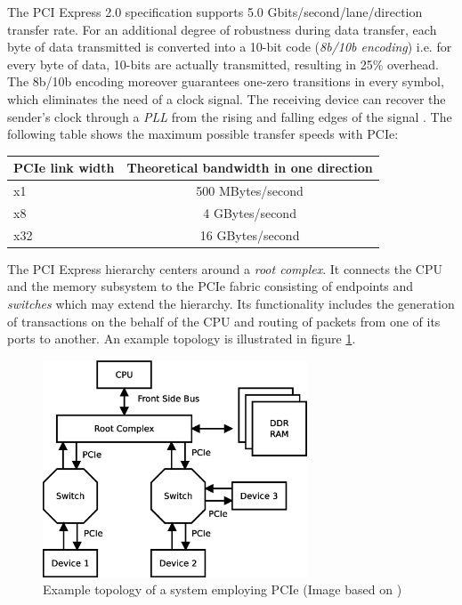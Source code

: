 The PCI Express 2.0 specification supports 5.0 Gbits/second/lane/direction transfer rate. %
For an additional degree of robustness during data transfer, each byte of data transmitted is converted into a 10-bit code (\emph{8b/10b encoding}) i.e. for every byte of data, 10-bits are actually transmitted, resulting in 25\% overhead.
The 8b/10b encoding moreover guarantees one-zero transitions in every symbol, which eliminates the need of a clock signal.
The receiving device can recover the sender's clock through a \emph{PLL} from the rising and falling edges of the signal \cite{pcie}.
The following table shows the maximum possible transfer speeds with PCIe:


\begin{center}
\begin{tabular}{| l | c |}
	\hline
	PCIe link width & Theoretical bandwidth in one direction\\
	\hline
	x1 &   500 MBytes/second\\
	x8 &   4   GBytes/second\\
	x32 &  16   GBytes/second\\
	\hline  
\end{tabular}
\end{center}

The PCI Express hierarchy centers around a \emph{root complex}. It connects the CPU and the memory subsystem to the PCIe fabric consisting of endpoints and \emph{switches} which may extend the hierarchy.
Its functionality includes the generation of transactions on the behalf of the CPU and routing of packets from one of its ports to another. \cite{pcie}
An example topology is illustrated in figure \ref{fig:pcie_topo}.

\begin{figure}[htb]
	  \centerline{
		\includegraphics[width=0.7\textwidth]{images/PCIE.eps}}
	  \caption{Example topology of a system employing PCIe (Image based on \cite{pcie})}
	  \label{fig:pcie_topo}
\end{figure}


